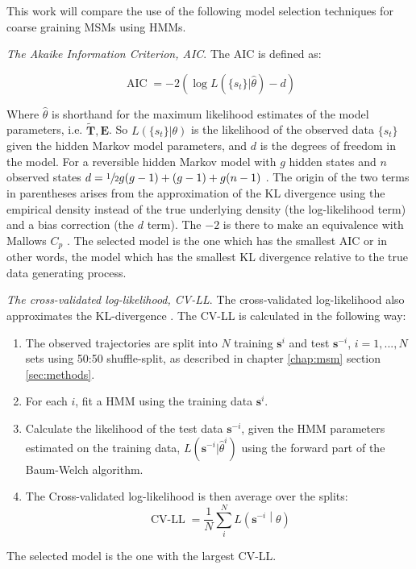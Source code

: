 This work will compare the use of the following model selection techniques for coarse graining MSMs using HMMs.  

\emph{The Akaike Information Criterion, AIC}. The AIC is defined as:

\begin{equation}
    \operatorname{AIC} = -2\left(\log{L\left(\{s_t\}|\hat{\theta}\right)} - d\right)
\end{equation}

Where $\hat{\theta}$ is shorthand for the maximum likelihood estimates of the model parameters, i.e. $\tilde{\mathbf{T}}, \mathbf{E}$. So $L(\{s_t\}|\theta)$ is the likelihood of the observed data $\{s_t\}$ given the hidden Markov model parameters,  and $d$ is the degrees of freedom in the model. For a reversible hidden Markov model with $g$ hidden states and $n$ observed states  $d = \sfrac{1}{2}g(g-1) + (g-1) + g(n-1)$ \cite{trendelkamp-schroerEstimationUncertaintyReversible2015b}. The origin of the two terms in parentheses arises from the approximation of the KL divergence using the empirical density instead of the true underlying density (the log-likelihood term) and a bias correction (the $d$ term). The $-2$ is there to make an equivalence with Mallows $C_p$ \cite{friedman2001elements}. The selected model is the one which has the smallest AIC or in other words, the model which has the smallest KL divergence relative to the true data generating process. 

\emph{The cross-validated log-likelihood, CV-LL}. The cross-validated log-likelihood also approximates the KL-divergence \cite{celeuxSelectingHiddenMarkov2008}. The CV-LL is calculated in the following way: 
\begin{enumerate}
    \item The observed trajectories are split into $N$ training $\mathbf{s}^{i}$ and test $\mathbf{s}^{-i}$, $i = 1, ..., N$ sets using 50:50 shuffle-split, as described in chapter \ref{chap:msm} section \ref{sec:methods}. 
    \item For each $i$, fit a HMM using the training data $\mathbf{s}^{i}$. 
    \item Calculate the likelihood of the test data $\mathbf{s}^{-i}$, given the HMM parameters estimated on the training data, $L(\mathbf{s}^{-i}|\hat{\theta}^{i})$ using the forward part of the Baum-Welch algorithm. 
    \item The Cross-validated log-likelihood is then average over the splits: 
    \begin{equation}
        \operatorname{CV-LL} = \frac{1}{N}\sum_{i}^{N}L\left(\mathbf{s}^{-i}\middle|\theta\right)
    \end{equation}
\end{enumerate}
The selected model is the one with the largest CV-LL.  


